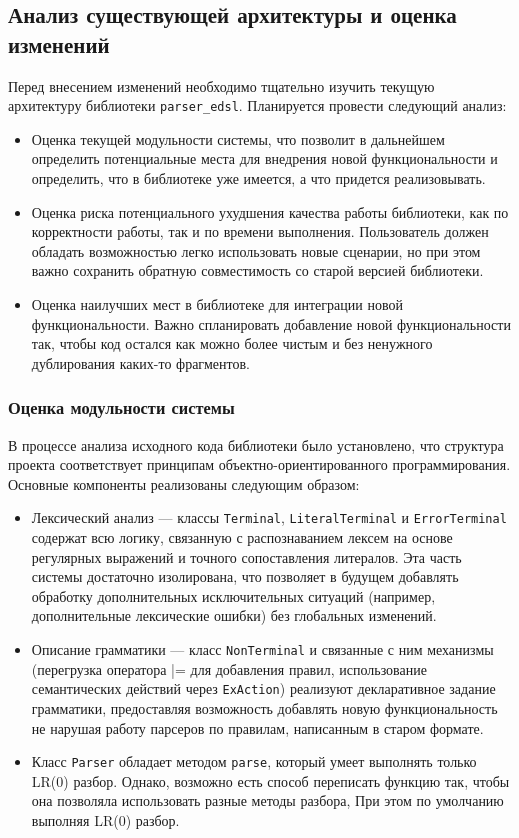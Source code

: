 \documentclass[14pt, russian]{scrartcl}
\begin{document}
\subsection{Анализ существующей архитектуры и оценка изменений}

Перед внесением изменений необходимо тщательно изучить текущую архитектуру библиотеки \texttt{parser\_edsl}.
Планируется провести следующий анализ:
\begin{itemize}
	\item Оценка текущей модульности системы, что позволит в дальнейшем определить потенциальные места для внедрения новой
	функциональности и определить, что в библиотеке уже имеется, а что придется реализовывать.
	\item Оценка риска потенциального ухудшения качества работы библиотеки, как по корректности работы, так и по
	времени выполнения. Пользователь должен обладать возможностью легко использовать новые сценарии,
	но при этом важно сохранить обратную совместимость со старой
	версией библиотеки.
	\item Оценка наилучших мест в библиотеке для интеграции новой функциональности. Важно спланировать добавление
	новой функциональности так, чтобы код остался как можно более чистым и без ненужного дублирования каких-то
	фрагментов.
\end{itemize}

\subsubsection{Оценка модульности системы}

В процессе анализа исходного кода библиотеки было установлено, что структура проекта соответствует принципам
объектно-ориентированного программирования. Основные компоненты реализованы следующим образом:

\begin{itemize}
	\item Лексический анализ --- классы \texttt{Terminal}, \texttt{LiteralTerminal} и \texttt{ErrorTerminal} содержат всю логику,
	связанную с распознаванием лексем на основе регулярных выражений и точного сопоставления литералов.
	Эта часть системы достаточно изолирована, что позволяет в будущем добавлять обработку дополнительных исключительных
	ситуаций (например, дополнительные лексические ошибки) без глобальных изменений.
	\item Описание грамматики --- класс \texttt{NonTerminal} и связанные с ним механизмы (перегрузка оператора |= для
	добавления правил, использование семантических действий через \texttt{ExAction}) реализуют декларативное
	задание грамматики, предоставляя возможность добавлять новую функциональность не нарушая работу парсеров по правилам,
	написанным в старом формате.
	\item Класс \texttt{Parser} обладает методом \texttt{parse}, который умеет выполнять только LR(0) разбор.
	Однако, возможно есть способ переписать функцию так, чтобы она позволяла использовать разные методы разбора,
	При этом по умолчанию выполняя LR(0) разбор.
\end{itemize}
\end{document}
